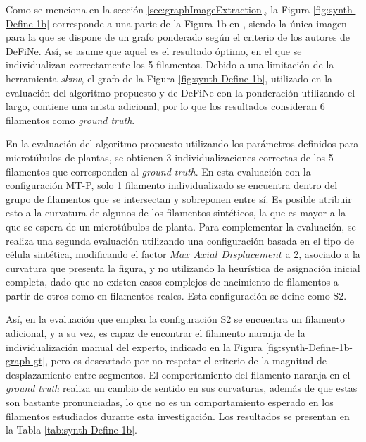 
Como se menciona en la secci\'on \ref{sec:graphImageExtraction}, la Figura \ref{fig:synth-Define-1b} corresponde a una parte de la Figura 1b en \citet{breuer2015define}, siendo la \'unica imagen para la que se dispone de un grafo ponderado seg\'un el criterio de los autores de DeFiNe. As\'i, se asume que aquel es el resultado \'optimo, en el que se individualizan correctamente los 5 filamentos. Debido a una limitaci\'on de la herramienta {\it sknw}, el grafo de la Figura \ref{fig:synth-Define-1b}, utilizado en la evaluaci\'on del algoritmo propuesto y de DeFiNe con la ponderaci\'on utilizando el largo, contiene una arista adicional, por lo que los resultados consideran 6 filamentos como {\it ground truth}.


En la evaluaci\'on del algoritmo propuesto utilizando los par\'ametros definidos para microt\'ubulos de plantas, se obtienen 3 individualizaciones correctas de los 5 filamentos que corresponden al {\it ground truth}. En esta evaluaci\'on con la configuraci\'on MT-P, solo 1 filamento individualizado se encuentra dentro del grupo de filamentos que se intersectan y sobreponen entre s\'i. Es posible atribuir esto a la curvatura de algunos de los filamentos sint\'eticos, la que es mayor a la que se espera de un microt\'ubulos de planta. Para complementar la evaluaci\'on, se realiza una segunda evaluaci\'on utilizando una configuraci\'on basada en el tipo de c\'elula sint\'etica, modificando el factor $Max\_Axial\_Displacement$ a 2, asociado a la curvatura que presenta la figura, y no utilizando la heur\'istica de asignaci\'on inicial completa, dado que no existen casos complejos de nacimiento de filamentos a partir de otros como en filamentos reales. Esta configuraci\'on se deine como S2.

As\'i, en la evaluaci\'on que emplea la configuraci\'on S2 se encuentra un filamento adicional, y a su vez, es capaz de encontrar el filamento naranja de la individualizaci\'on manual del experto, indicado en la Figura \ref{fig:synth-Define-1b-graph-gt}, pero es descartado por no respetar el criterio de la magnitud de desplazamiento entre segmentos. El comportamiento del filamento naranja en el {\it ground truth} realiza un cambio de sentido en sus curvaturas, adem\'as de que estas son bastante pronunciadas, lo que no es un comportamiento esperado en los filamentos estudiados durante esta investigaci\'on. Los resultados se presentan en la Tabla \ref{tab:synth-Define-1b}.




